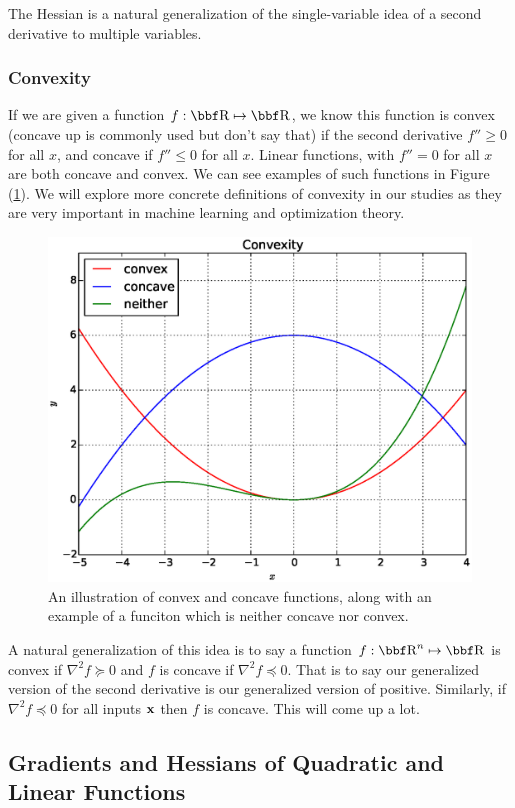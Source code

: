 \documentclass{article}
\begin{document}
The Hessian is a natural generalization of the single-variable idea of a second derivative to
multiple variables.

\subsubsection{Convexity}

If we are given a function $f : \RR \mapsto \RR$, we know this function is convex (concave up is
commonly used but don't say that) if the second derivative $f'' \geq 0$ for all $x$, and concave if
$f'' \leq 0$ for all $x$. Linear functions, with $f''=0$ for all $x$ are both concave and convex.
We can see examples of such functions in Figure (\ref{fig:convex}). We will explore more concrete
definitions of convexity in our studies as they are very important in machine learning and
optimization theory.\\

\begin{figure}[htpb]
    \centering
    \includegraphics[width=0.8\linewidth]{fig/convexity.eps}
    \caption{An illustration of convex and concave functions, along with
    an example of a funciton which is neither concave nor convex.}
    \label{fig:convex}
\end{figure}

A natural generalization of this idea is to say a function $f : \RR^n \mapsto \RR$ is
convex if $\nabla^2 f \succeq 0$ and $f$ is concave if $\nabla^2 f \preceq 0$. That is
to say our generalized version of the second derivative is our generalized version of
positive. Similarly, if $\nabla^2 f \preceq 0$ for all inputs ${\bf x}$ then $f$ is concave.
This will come up a lot.

\subsection{Gradients and Hessians of Quadratic and Linear Functions}
\end{document}
